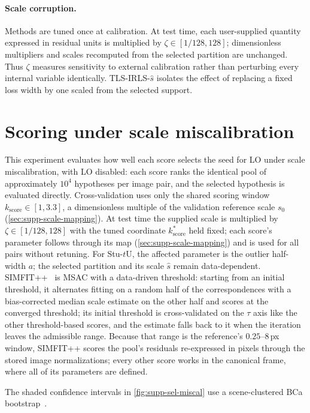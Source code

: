 \documentclass[runningheads]{llncs}
\newcommand{\stuU}{Stu-$t$U}
\newcommand{\kscore}{k_{\mathrm{score}}}
\newcommand{\tlsirls}{TLS-IRLS}
\begin{document}
\paragraph{Scale corruption.}
Methods are tuned once at calibration. At test time, each user-supplied
quantity expressed in residual units is multiplied by
$\zeta\in[1/128,128]$; dimensionless multipliers and scales recomputed from the
selected partition are unchanged. Thus $\zeta$ measures sensitivity to
external calibration rather than perturbing every internal variable
identically. \tlsirls{}-$\hat s$ isolates the effect of replacing a fixed
loss width by one scaled from the selected support.

\section{Scoring under scale miscalibration}
\label{sec:supp-scoring}
This experiment evaluates how well each score selects the seed for LO
under scale miscalibration, with LO disabled: each score ranks the
identical pool of approximately $10^4$ hypotheses per image pair, and the
selected hypothesis is evaluated directly. Cross-validation uses only the
shared scoring window $\kscore\in[1,3.3]$, a dimensionless multiple of
the validation reference scale $s_0$ (\cref{sec:supp-scale-mapping}). At test time
the supplied scale is multiplied by $\zeta\in[1/128,128]$ with the
tuned coordinate $\kscore^*$ held fixed; each score's parameter follows
through its map (\cref{sec:supp-scale-mapping}) and is used for all pairs
without retuning. For \stuU{}, the affected parameter is the outlier
half-width $a$; the selected partition and its scale $\hat s$ remain
data-dependent. SIMFIT++~\cite{Edstedt2025} is MSAC with a data-driven
threshold: starting from an initial threshold, it alternates fitting on a
random half of the correspondences with a bias-corrected median scale
estimate on the other half and scores at the converged threshold; its
initial threshold is cross-validated on the $\tau$ axis like the other
threshold-based scores, and the estimate falls back to it when the
iteration leaves the admissible range. Because that range is the reference's
$0.25$--$8$\,px window, SIMFIT++ scores the pool's residuals re-expressed in
pixels through the stored image normalizations; every other score works in
the canonical frame, where all of its parameters are defined.

The shaded confidence intervals in \cref{fig:supp-sel-miscal} use a
scene-clustered BCa bootstrap~\cite{Efron1987}.
\end{document}
